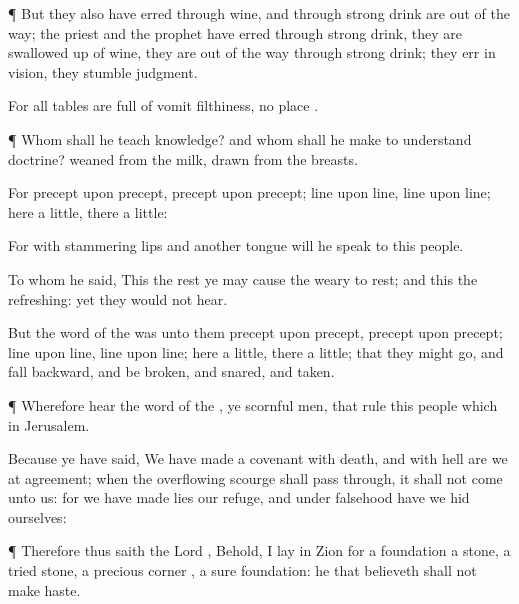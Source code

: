 {\par }{\PP {}¶ But
they also have
erred through
wine, and through strong
drink are out of the
way; the
priest and the
prophet have
erred through strong
drink, they are swallowed
up
of
wine, they are out of the
way through strong
drink; they
err in
vision, they
stumble
{}
judgment.

For all
tables are
full of
vomit
{}
filthiness,
{} no
place
{}.


\par }{\PP {}¶ Whom shall he
teach
knowledge? and whom shall he make to
understand
doctrine?
{}
weaned from the
milk,
{}
drawn from the
breasts.

For
precept
{} upon
precept,
precept upon
precept;
line upon
line,
line upon
line; here a
little,
{} there a
little:

For with
stammering
lips and
another
tongue will he
speak to this
people.

To whom he
said, This
{} the
rest
{} ye may cause the
weary to
rest; and this
{} the
refreshing: yet they
would not
hear.

But the
word of the
{} was unto them
precept upon
precept,
precept upon
precept;
line upon
line,
line upon
line; here a
little,
{} there a
little; that they might
go, and
fall
backward, and be
broken, and
snared, and
taken.


\par }{\PP {}¶ Wherefore
hear the
word of the
{}, ye
scornful
men, that
rule this
people which
{} in
Jerusalem.

Because ye have
said, We have
made a
covenant with
death, and with
hell are
we at
agreement; when the
overflowing
scourge shall pass
through, it shall not
come unto us: for we have
made
lies our
refuge, and under
falsehood have we
hid ourselves:


\par }{\PP {}¶ Therefore thus
saith the
Lord
{}, Behold, I
lay in
Zion for a foundation a
stone, a
tried
stone, a
precious
corner
{}, a
sure
foundation: he that
believeth shall not make
haste.

}
